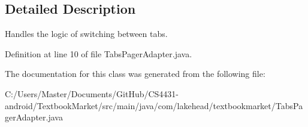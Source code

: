 \subsection{Detailed Description}
Handles the logic of switching between tabs. 

Definition at line 10 of file Tabs\-Pager\-Adapter.\-java.



The documentation for this class was generated from the following file\-:\begin{DoxyCompactItemize}
\item 
C\-:/\-Users/\-Master/\-Documents/\-Git\-Hub/\-C\-S4431-\/android/\-Textbook\-Market/src/main/java/com/lakehead/textbookmarket/Tabs\-Pager\-Adapter.\-java\end{DoxyCompactItemize}
